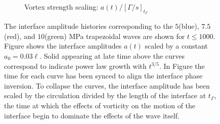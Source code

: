 \documentclass{article}
\begin{document}
\begin{figure}
\begin{subfigure}[b]{0.45\textwidth}
    \caption{\label{fig:trapz_interface_t1000_scaled} Vortex strength scaling: $a(t)/\left[\Gamma/s\right]_{t_\Gamma}$}
  \end{subfigure}
  \caption[The interface amplitude at long time]{The interface
    amplitude histories corresponding to the $5$(blue), $7.5$ (red),
    and $10$(green) MPa trapezoidal waves are shown for $t\leq
    1000$. Figure \protect{} shows the
    interface amplitudes $a(t)$ scaled by a constant
    $a_0=0.03\ell$. Solid appearing at late time above the curves
    correspond to indicate power law growth with $t^{3/5}$. In Figure
    \protect{} the time for each curve
    has been synced to align the interface phase inversion. To
    collapse the curves, the interface amplitude has been scaled by
    the circulation divided by the length of the interface at
    $t_\Gamma$, the time at which the effects of vorticity on the
    motion of the interface begin to dominate the effects of the
    wave itself.}
  \label{fig:trapz_interface_loglog}
\end{figure}
\end{document}
